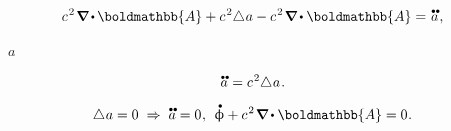 \begin{gather*}
c^{\hspace{.16ex}2} \hspace{.22ex} \boldnabla \hspace{-0.12ex} \dotp \hspace{-0.12ex} \boldmathbb{A} + c^{\hspace{.16ex}2} \hspace{-0.4ex} \Laplacian \hspace{.07ex} a
- c^{\hspace{.16ex}2} \hspace{.22ex} \boldnabla \hspace{-0.1ex} \dotp \boldmathbb{A} = \hspace{.15ex} \mathdotdotabove{a}
\hspace{.16ex} ,
\end{gather*}

\vspace{-0.16em}\noindent
{}
\href{https://en.wikipedia.org/wiki/Wave_equation}{}
~$a$

\nopagebreak\vspace{-0.12em}\begin{equation}\label{gaugeadditioniswave}
\mathdotdotabove{a} \hspace{.1ex} = c^{\hspace{.16ex}2} \hspace{-0.4ex} \Laplacian \hspace{.07ex} a
\hspace{.16ex} .
\end{equation}

\vspace{-0.15em}\noindent
{}\ru{\:---}

\nopagebreak\vspace{-0.1em}\begin{equation*}
\Laplacian \hspace{.07ex} a = 0
\hspace{.3em} \Rightarrow \hspace{.3em}
\mathdotdotabove{a} = 0
\hspace{.1ex} , \:\:
\mathdotabove{\upphi} + c^{\hspace{.16ex}2} \hspace{.22ex} \boldnabla \hspace{-0.1ex} \dotp \boldmathbb{A} = 0
\hspace{.1ex} .
\end{equation*}

